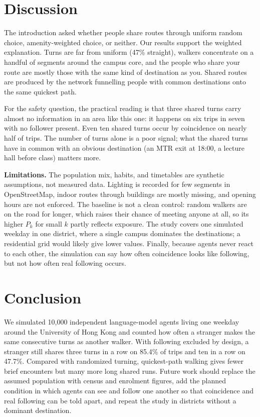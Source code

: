 \documentclass[9pt]{ieeeconf}
\begin{document}
\section{Discussion}
\label{sec:discussion}
The introduction asked whether people share routes through uniform random choice, amenity-weighted choice, or neither. Our results support the weighted explanation. Turns are far from uniform (47\% straight), walkers concentrate on a handful of segments around the campus core, and the people who share your route are mostly those with the same kind of destination as you. Shared routes are produced by the network funnelling people with common destinations onto the same quickest path.

For the safety question, the practical reading is that three shared turns carry almost no information in an area like this one: it happens on six trips in seven with no follower present. Even ten shared turns occur by coincidence on nearly half of trips. The number of turns alone is a poor signal; what the shared turns have in common with an obvious destination (an MTR exit at 18:00, a lecture hall before class) matters more.

\textbf{Limitations.} The population mix, habits, and timetables are synthetic assumptions, not measured data. Lighting is recorded for few segments in OpenStreetMap, indoor routes through buildings are mostly missing, and opening hours are not enforced. The baseline is not a clean control: random walkers are on the road for longer, which raises their chance of meeting anyone at all, so its higher $P_k$ for small $k$ partly reflects exposure. The study covers one simulated weekday in one district, where a single campus dominates the destinations; a residential grid would likely give lower values. Finally, because agents never react to each other, the simulation can say how often coincidence looks like following, but not how often real following occurs.

\section{Conclusion}
\label{sec:conclusion}
We simulated 10,000 independent language-model agents living one weekday around the University of Hong Kong and counted how often a stranger makes the same consecutive turns as another walker. With following excluded by design, a stranger still shares three turns in a row on 85.4\% of trips and ten in a row on 47.7\%. Compared with randomized turning, quickest-path walking gives fewer brief encounters but many more long shared runs. Future work should replace the assumed population with census and enrolment figures, add the planned condition in which agents can see and follow one another so that coincidence and real following can be told apart, and repeat the study in districts without a dominant destination.
\end{document}
